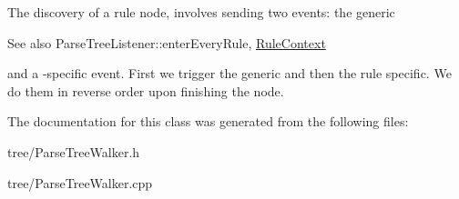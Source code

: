 The discovery of a rule node, involves sending two events\+: the generic \begin{DoxySeeAlso}{See also}
Parse\+Tree\+Listener\+::enter\+Every\+Rule, \hyperlink{classantlr4_1_1RuleContext}{Rule\+Context}


\end{DoxySeeAlso}
and a -\/specific event. First we trigger the generic and then the rule specific. We do them in reverse order upon finishing the node. 

The documentation for this class was generated from the following files\+:\begin{DoxyCompactItemize}
\item 
tree/Parse\+Tree\+Walker.\+h\item 
tree/Parse\+Tree\+Walker.\+cpp\end{DoxyCompactItemize}
